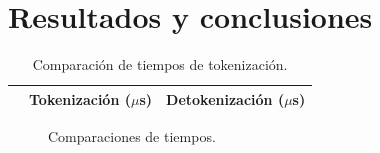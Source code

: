 %
%
%


\section{Resultados y conclusiones}
\label{sec:conclusiones}

\begin{table}
  \renewcommand{\arraystretch}{1.3}
  \centering
  \caption{Comparación de tiempos de tokenización.}
  \label{tabla:tiempos_tokenizacion}
  \begin{tabular}{c c c}
    \hline
     & Tokenización ($\mu$s) & Detokenización ($\mu$s) \\
    \hline
    
    \hline
  \end{tabular}
\end{table}

\begin{figure}[!t]
  \centering
  \caption{Comparaciones de tiempos.}
  \label{fig_sim}
\end{figure}



